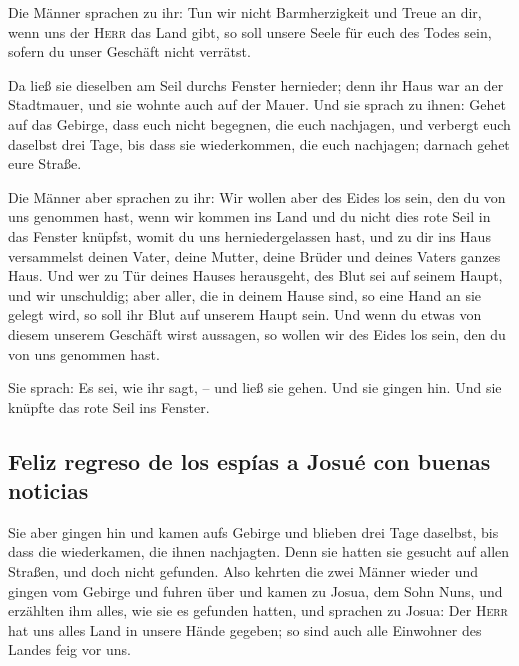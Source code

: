  Die Männer sprachen zu ihr: Tun wir nicht Barmherzigkeit
und Treue an dir, wenn uns der \textsc{Herr} das Land gibt, so soll
unsere Seele für euch des Todes sein, sofern du unser Geschäft nicht
verrätst.

 Da ließ sie dieselben am Seil durchs Fenster hernieder;
denn ihr Haus war an der Stadtmauer, und sie wohnte auch auf der Mauer.
 Und sie sprach zu ihnen: Gehet auf das Gebirge, dass
euch nicht begegnen, die euch nachjagen, und verbergt euch daselbst drei
Tage, bis dass sie wiederkommen, die euch nachjagen; darnach gehet eure
Straße.

 Die Männer aber sprachen zu ihr: Wir wollen aber des
Eides los sein, den du von uns genommen hast,  wenn wir
kommen ins Land und du nicht dies rote Seil in das Fenster knüpfst,
womit du uns herniedergelassen hast, und zu dir ins Haus versammelst
deinen Vater, deine Mutter, deine Brüder und deines Vaters ganzes Haus.
 Und wer zu Tür deines Hauses herausgeht, des Blut sei
auf seinem Haupt, und wir unschuldig; aber aller, die in deinem Hause
sind, so eine Hand an sie gelegt wird, so soll ihr Blut auf unserem
Haupt sein.  Und wenn du etwas von diesem unserem
Geschäft wirst aussagen, so wollen wir des Eides los sein, den du von
uns genommen hast.

 Sie sprach: Es sei, wie ihr sagt, -- und ließ sie gehen.
Und sie gingen hin. Und sie knüpfte das rote Seil ins Fenster.

\hypertarget{feliz-regreso-de-los-espuxedas-a-josuuxe9-con-buenas-noticias}{%
\subsection{Feliz regreso de los espías a Josué con buenas
noticias}\label{feliz-regreso-de-los-espuxedas-a-josuuxe9-con-buenas-noticias}}

 Sie aber gingen hin und kamen aufs Gebirge und blieben
drei Tage daselbst, bis dass die wiederkamen, die ihnen nachjagten. Denn
sie hatten sie gesucht auf allen Straßen, und doch nicht gefunden.
 Also kehrten die zwei Männer wieder und gingen vom
Gebirge und fuhren über und kamen zu Josua, dem Sohn Nuns, und erzählten
ihm alles, wie sie es gefunden hatten,  und sprachen zu
Josua: Der \textsc{Herr} hat uns alles Land in unsere Hände gegeben; so
sind auch alle Einwohner des Landes feig vor uns.

